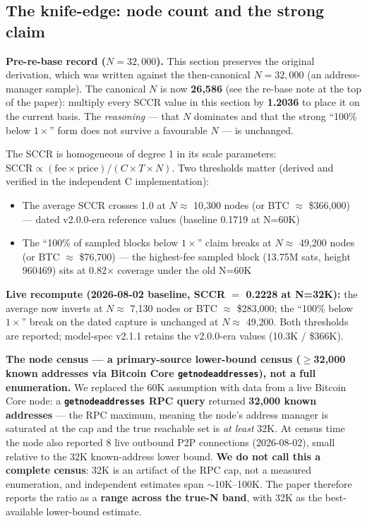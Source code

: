 \documentclass[11pt]{article}
\begin{document}
\subsection{The knife-edge: node count and the strong claim}\label{sec:5.4}
\textbf{Pre-re-base record ($N=32{,}000$).} This section preserves the original derivation, which was written against the then-canonical $N=32{,}000$ (an address-manager sample). The canonical $N$ is now \textbf{26{,}586} (see the re-base note at the top of the paper): multiply every SCCR value in this section by \textbf{1.2036} to place it on the current basis. The \emph{reasoning} --- that $N$ dominates and that the strong ``100\% below $1\times$'' form does not survive a favourable $N$ --- is unchanged.

The SCCR is homogeneous of degree 1 in its scale parameters: $\mathrm{SCCR} \propto (\mathrm{fee} \times \mathrm{price}) / (C \times T \times N)$. Two thresholds matter (derived and verified in the independent C implementation):
\begin{itemize}[nosep]
  \item The average SCCR crosses 1.0 at $N \approx$ 10{,}300 nodes (or BTC $\approx$ \$366{,}000) --- dated v2.0.0-era reference values (baseline 0.1719 at N=60K)
  \item The ``100\% of sampled blocks below $1\times$'' claim breaks at $N \approx$ 49{,}200 nodes (or BTC $\approx$ \$76{,}700) --- the highest-fee sampled block (13.75M sats, height 960469) sits at 0.82$\times$ coverage under the old N=60K
\end{itemize}
\textbf{Live recompute (2026-08-02 baseline, SCCR $=$ 0.2228 at N=32K):} the average now inverts at $N \approx$ 7{,}130 nodes or BTC $\approx$ \$283{,}000; the ``100\% below $1\times$'' break on the dated capture is unchanged at $N \approx$ 49{,}200. Both thresholds are reported; model-spec v2.1.1 retains the v2.0.0-era values (10.3K / \$366K).

\textbf{The node census --- a primary-source lower-bound census ($\geq$32{,}000 known addresses via Bitcoin Core \texttt{getnodeaddresses}), not a full enumeration.} We replaced the 60K assumption with data from a live Bitcoin Core node: a \textbf{\texttt{getnodeaddresses} RPC query} returned \textbf{32{,}000 known addresses} --- the RPC maximum, meaning the node's address manager is saturated at the cap and the true reachable set is \emph{at least} 32K. At census time the node also reported 8 live outbound P2P connections (2026-08-02), small relative to the 32K known-address lower bound. \textbf{We do not call this a complete census}: 32K is an artifact of the RPC cap, not a measured enumeration, and independent estimates span $\sim$10K--100K. The paper therefore reports the ratio as a \textbf{range across the true-N band}, with 32K as the best-available lower-bound estimate.
\end{document}
